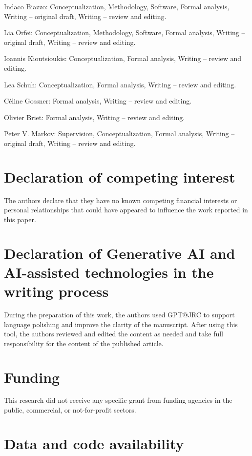 \documentclass[preprint,12pt]{elsarticle}
\begin{document}
Indaco Biazzo: Conceptualization, Methodology, Software, Formal analysis,
Writing -- original draft, Writing -- review and editing.

Lia Orfei: Conceptualization, Methodology, Software, Formal analysis,
Writing -- original draft, Writing -- review and editing.

Ioannis Kioutsioukis: Conceptualization, Formal analysis,
Writing -- review and editing.

Lea Schuh: Conceptualization, Formal analysis,
Writing -- review and editing.

Céline Gossner: Formal analysis, Writing -- review and editing.

Olivier Briet: Formal analysis, Writing -- review and editing.

Peter V. Markov: Supervision, Conceptualization, Formal analysis,
Writing -- original draft, Writing -- review and editing.


\section*{Declaration of competing interest}

The authors declare that they have no known competing financial interests
or personal relationships that could have appeared to influence the work
reported in this paper.

\section*{Declaration of Generative AI and AI-assisted technologies in the writing process}

During the preparation of this work, the authors used GPT@JRC to support
language polishing and improve the clarity of the manuscript. After using
this tool, the authors reviewed and edited the content as needed and take
full responsibility for the content of the published article.

\section*{Funding}

This research did not receive any specific grant from funding agencies
in the public, commercial, or not-for-profit sectors.

\section*{Data and code availability}
\end{document}
